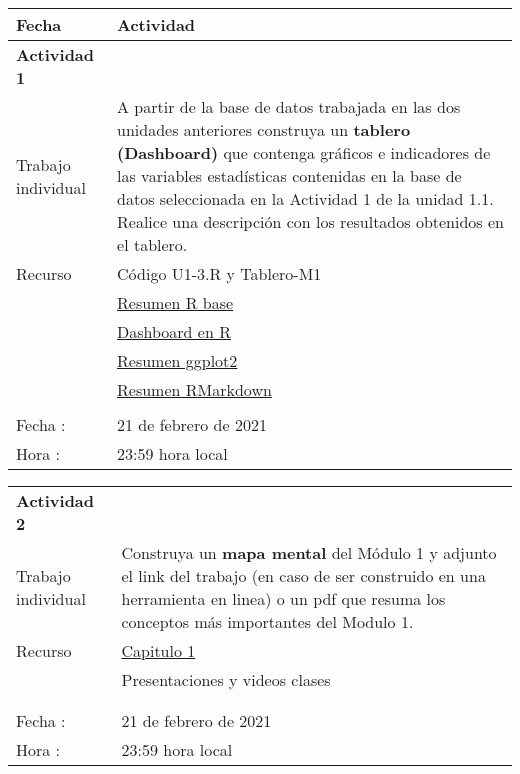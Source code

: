 \documentclass[base=hide,11pt]{elegantbook}
\begin{document}
\begin{tabular}{p{4cm}p{10cm}}
\hline	
Fecha                   & Actividad	\\
\hline 	
{\bf Actividad 1}       & \\
Trabajo individual      & A partir de la base de datos trabajada en las dos unidades anteriores construya un {\bf tablero (Dashboard) } que contenga gráficos e indicadores de las variables estadísticas contenidas  en la base de datos seleccionada en la Actividad 1 de la unidad 1.1. Realice una descripción con los resultados obtenidos en el tablero. \\
 
Recurso                 &  Código U1-3.R  y Tablero-M1 \\
                        & \href{https://rstudio.com/wp-content/uploads/2016/10/r-cheat-sheet-3.pdf}{Resumen R base}\\
                        &  \href{https://rmarkdown.rstudio.com/flexdashboard/index.html}{Dashboard en R} \\
                        &  \href{https://rstudio.com/wp-content/uploads/2015/03/ggplot2-cheatsheet.pdf}{Resumen ggplot2}\\
                        & \href{https://rstudio.com/wp-content/uploads/2015/02/rmarkdown-cheatsheet.pdf}{Resumen RMarkdown} \\
                        & \\
Fecha  :                & 21 de febrero de 2021\\
Hora   :                & 23:59 hora local \\
\hline 
\end{tabular}
\begin{tabular}{p{4cm}p{10cm}}
	{\bf Actividad 2}  & \\
	Trabajo individual &  Construya un {\bf mapa mental} del Módulo 1  y adjunto el link del trabajo (en caso de ser construido en una herramienta en linea) o un pdf  que resuma los conceptos más importantes del Modulo 1. \\
	Recurso            &  \href{https://javerianacaliedu-my.sharepoint.com/:b:/g/personal/dgonzalez_javerianacali_edu_co/ESNCJjqQY8dGlgqu2hm7GTwBq6Fi7GGwB88ul_vw1BWMgg?e=AwTRZM}{Capitulo 1} \\
	& Presentaciones y videos clases \\
	& \\
	& \\
	Fecha  :                & 21 de febrero de 2021\\
	Hora   :                & 23:59 hora local \\
	\hline 
\end{tabular}
\end{document}
